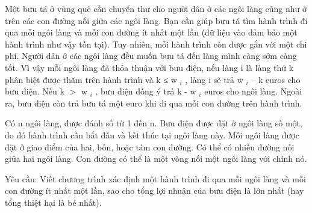 Một bưu tá ở vùng quê cần chuyển thư cho người dân ở các ngôi làng cũng như ở trên các con đường nối giữa các ngôi làng. Bạn cần giúp bưu tá tìm hành trình đi qua mỗi ngôi làng và mỗi con đường ít   nhất một lần (dữ liệu vào đảm bảo một hành trình như vậy tồn tại). Tuy nhiên, mỗi hành trình còn được gắn với một chi phí. Người dân ở các ngôi làng đều muốn bưu tá đến làng mình càng sớm càng tốt. Vì vậy   mỗi ngôi làng đã thỏa thuận với bưu điện, nếu làng i là làng thứ k phân biệt được thăm trên hành trình và k ≤ w   $_    i   $   , làng i sẽ trả w   $_    i   $   – k euros cho bưu điện. Nếu k $>$ w   $_    i   $   ,   bưu điện đồng ý trả k - w   $_    i   $   euros cho ngôi làng. Ngoài ra, bưu điện còn trả bưu tá một euro khi đi qua mỗi con đường trên hành trình.  

   Có n ngôi làng, được đánh số từ 1 đến n. Bưu điện được đặt ở ngôi làng số một, do đó hành trình cần bắt đầu và kết thúc tại ngôi làng này. Mỗi ngôi làng được đặt ở giao điểm của hai, bốn, hoặc tám con   đường. Có thể có nhiều đường nối giữa hai ngôi làng. Con đường có thể là một vòng nối một ngôi làng với chính nó.  

   Yêu cầu: Viết chương trình xác định một hành trình đi qua mỗi ngôi làng và mỗi con đường ít nhất một lần, sao cho tổng lợi nhuận của bưu điện là lớn nhất (hay tổng thiệt hại là bé nhất).  

\